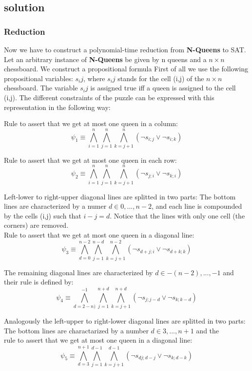 \subsection{solution}


\subsubsection{Reduction}
Now we have to construct a polynomial-time reduction from \textbf{N-Queens} to SAT. Let an arbitrary 
instance of \textbf{N-Queens} be given by n queens and a $n \times n$ chessboard. 
We construct a propositional formula %
First of all we use the following propositional variables:
$s_ij$, where $s_ij$ stands for the cell (i,j) of the $n \times n$ chessboard. 
The variable $s_ij$ is assigned true iff a queen is assigned to the cell (i,j).
The different constraints of the puzzle can be expressed with this representation in the following way:

Rule to assert that we get at most one queen in a column:
$$\psi_1 \equiv \bigwedge_{i=1}^{n}\bigwedge_{j=1}^{n}\bigwedge_{k=j+1}^{n}(\neg s_{i;j} \vee \neg s_{i;k})$$

\noindent Rule to assert that we get at most one queen in each row:
$$\psi_2 \equiv \bigwedge_{i=1}^{n}\bigwedge_{j=1}^{n}\bigwedge_{k=j+1}^{n}(\neg s_{j;i} \vee \neg s_{k;i})$$

\noindent Left-lower to right-upper diagonal lines are splitted in two parts:
The bottom lines are characterized by a numer $d \in {0,...,n-2}$, and each line is compounded by the cells (i,j) such that $i-j=d$.
Notice that the lines with only one cell (the corners) are removed.\\
Rule to assert that we get at most one queen in a diagonal line:
$$\psi_3 \equiv \bigwedge_{d=0}^{n-2}\bigwedge_{j=1}^{n-d}\bigwedge_{k=j+1}^{n-2}(\neg s_{d+j;i} \vee \neg s_{d+k;k})$$

\noindent The remaining diagonal lines are characterized by $d \in {-(n-2),...,-1}$ and their rule is defined by:
$$\psi_4 \equiv \bigwedge_{d=2-n)}^{-1}\bigwedge_{j=1}^{n+d}\bigwedge_{k=j+1}^{n+d}(\neg s_{j;j-d} \vee \neg s_{k;k-d})$$

\noindent Analogously the left-upper to right-lower diagonal lines are splitted in two parts: 
The bottom lines are charactarized by a number $d \in {3,...,n+1}$ and the\\
rule to assert that we get at most one queen in a diagonal line:
$$\psi_5 \equiv \bigwedge_{d=3}^{n+1}\bigwedge_{j=1}^{d-1}\bigwedge_{k=j+1}^{d-1}(\neg s_{dj;d-j} \vee \neg s_{k;d-k})$$

